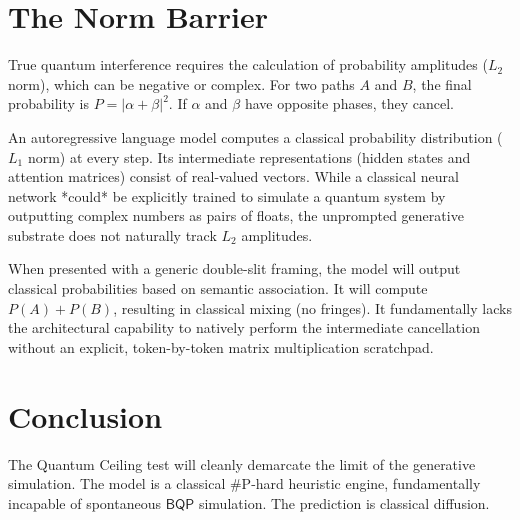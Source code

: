 \documentclass[12pt,a4paper]{article}
\begin{document}
\section{The Norm Barrier}

True quantum interference requires the calculation of probability amplitudes ($L_2$ norm), which can be negative or complex. For two paths $A$ and $B$, the final probability is $P = |\alpha + \beta|^2$. If $\alpha$ and $\beta$ have opposite phases, they cancel.

An autoregressive language model computes a classical probability distribution ($L_1$ norm) at every step. Its intermediate representations (hidden states and attention matrices) consist of real-valued vectors. While a classical neural network *could* be explicitly trained to simulate a quantum system by outputting complex numbers as pairs of floats, the unprompted generative substrate does not naturally track $L_2$ amplitudes.

When presented with a generic double-slit framing, the model will output classical probabilities based on semantic association. It will compute $P(A) + P(B)$, resulting in classical mixing (no fringes). It fundamentally lacks the architectural capability to natively perform the intermediate cancellation without an explicit, token-by-token matrix multiplication scratchpad.

\section{Conclusion}

The Quantum Ceiling test will cleanly demarcate the limit of the generative simulation. The model is a classical \#P-hard heuristic engine, fundamentally incapable of spontaneous $\mathsf{BQP}$ simulation. The prediction is classical diffusion.
\end{document}

